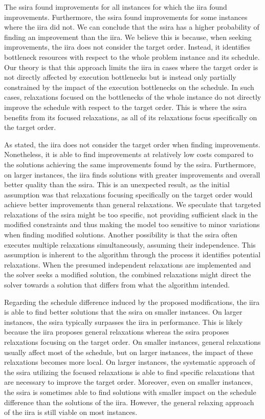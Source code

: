 The \ac{ssira} found improvements for all instances for which the \ac{iira} found improvements.
Furthermore, the \ac{ssira} found improvements for some instances where the \ac{iira} did not.
We can conclude that the \ac{ssira} has a higher probability of finding an improvement than the \ac{iira}.
We believe this is because, when seeking improvements, the \ac{iira} does not consider the target order.
Instead, it identifies bottleneck resources with respect to the whole problem instance
and its schedule.
Our theory is that this approach limits the \ac{iira} in cases
where the target order is not directly affected by execution bottlenecks
but is instead only partially constrained by the impact of the execution bottlenecks on the schedule.
In such cases, relaxations focused on the bottlenecks of the whole instance do not directly
improve the schedule with respect to the target order. 
This is where the \ac{ssira} benefits from its focused relaxations,
as all of its relaxations focus specifically on the target order.

As stated, the \ac{iira} does not consider the target order when finding improvements.
Nonetheless, it is able to find improvements at relatively low costs
compared to the solutions achieving the same improvements found by the \ac{ssira}.
Furthermore, on larger instances, the \ac{iira} finds solutions
with greater improvements and overall better quality than the \ac{ssira}.
This is an unexpected result,
as the initial assumption was that relaxations focusing specifically on the target order
would achieve better improvements than general relaxations.
We speculate that targeted relaxations of the \ac{ssira} might be too specific,
not providing sufficient slack in the modified constraints
and thus making the model too sensitive to minor variations when finding modified solutions.
Another possibility is that the \ac{ssira} often executes multiple relaxations simultaneously,
assuming their independence.
This assumption is inherent to the algorithm through the process it identifies potential relaxations.
When the presumed independent relaxations are implemented and the solver seeks a modified solution,
the combined relaxations might direct the solver towards a solution
that differs from what the algorithm intended.

Regarding the schedule difference induced by the proposed modifications,
the \ac{iira} is able to find better solutions that the \ac{ssira} on smaller instances.
On larger instances, the \ac{ssira} typically surpasses the \ac{iira} in performance.
This is likely because the \ac{iira} proposes general relaxations
whereas the \ac{ssira} proposes relaxations focusing on the target order.
On smaller instances, general relaxations usually affect most of the schedule,
but on larger instances, the impact of these relaxations becomes more local.
On larger instances, the systematic approach of the \ac{ssira} utilizing the focused relaxations
is able to find specific relaxations that are necessary to improve the target order.
Moreover, even on smaller instances, the \ac{ssira} is sometimes able to find solutions with
smaller impact on the schedule difference than the solutions of the \ac{iira}.
However, the general relaxing approach of the \ac{iira} is still viable on most instances.

